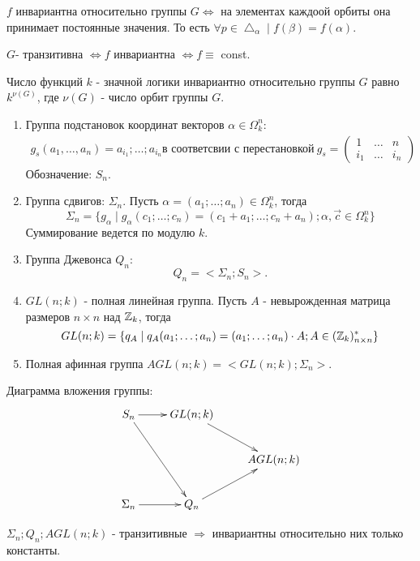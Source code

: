 \utv $f$ инвариантна относительно группы $G \Leftrightarrow$ на элементах каждоой орбиты она принимает постоянные значения.
То есть $\forall p \in \bigtriangleup_{\alpha} \mid f(\beta) = f(\alpha)$.

\conseq $G$- транзитивна $\Leftrightarrow f$ инвариантна $\Leftrightarrow f \equiv$ const.

\conseq Число функций $k$ - значной логики инвариантно относительно группы $G$ равно $k^{\nu(G)}$, где $\nu(G)$ - число орбит группы $G$.

\examplei
\begin{enumerate}
  \item Группа подстановок координат векторов $\alpha \in \Omega_k^n$:
    \begin{align*}
      g_s(a_1, \dots , a_n)  =  a_{i_1};\dots ;a_{i_n} \text{в соответсвии с перестановкой}\  
      g_s=
      \begin{pmatrix}
        1 & \ldots & n \\
        i_1 & \ldots & i_n
      \end{pmatrix}
  \end{align*}
  Обозначение: $S_n$.

  \item Группа сдвигов: $\Sigma_n $. Пусть $\alpha = (a_1;\dots;a_n) \in \Omega_k^n $, тогда
    $$
      \Sigma_n = \{g_\alpha \mid g_\alpha(c_1; \ldots; c_n)=(c_1+a_1; \ldots; c_n+a_n); \alpha, \vec{c} \in \Omega_k^n\}
    $$
  Суммирование ведется по модулю $k$.

  \item Группа Джевонса $Q_n$:
    $$
      Q_n = <\Sigma_n;S_n>.
    $$
  \item $GL(n;k)$ - полная линейная группа. Пусть $A$ - невырожденная матрица размеров $n \times n $ над $\mathbb{Z}_k$, тогда
  $$
    GL(n;k)=\{q_A \mid q_A(a_1;\ldots;a_n) = (a_1;\ldots;a_n) \cdot A; A \in (\mathbb{Z}_k)_{n \times n}^* \}
  $$

  \item Полная афинная группа $AGL(n;k)=<GL(n;k);\Sigma_n>$.
\end{enumerate}

Диаграмма вложения группы:
\begin{align*}
  \xymatrix{
    S_n      \ar[r] \ar[rdd]  & GL(n; k) \ar[rd] \\
    & & AGL(n;k) \\
    \Sigma_n \ar[r]  & Q_n \ar[ru]
  }
\end{align*}

$\Sigma_n; Q_n; AGL(n;k) $ - транзитивные $\Rightarrow$ инвариантны относительно них только константы.

